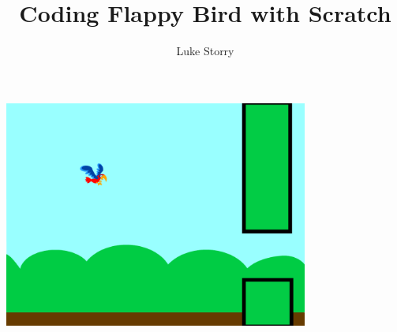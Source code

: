 \documentclass{article}
\title{Coding Flappy Bird with Scratch}
\author{Luke Storry}
\date{}
\begin{document}
\maketitle
{\begin{center}\includegraphics[width=10cm]{0001-overview}\end{center}}
\tableofcontents

 \centering







\end{document}
